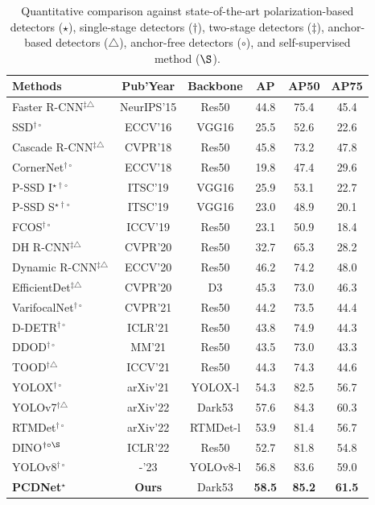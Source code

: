 \begin{table}[ht]
\caption{Quantitative comparison against state-of-the-art polarization-based detectors ($\star$), single-stage detectors ($\dag$), two-stage detectors ($\ddag$), anchor-based detectors ($\triangle$), anchor-free detectors ($\circ$), and self-supervised method ($\S$).}
\small
\centering
\renewcommand\arraystretch{0.9}
\setlength{\tabcolsep}{2.6pt}
\begin{tabular}{lccccc}
\hline\hline
Methods	&	Pub'Year	&	Backbone	&	AP	&	AP50	&	AP75	\\
\hline
Faster R-CNN$^{\ddag\triangle}$ 	&	NeurIPS'15	&	Res50	&	44.8	&	75.4	&	45.4	\\
SSD$^{\dag\circ}$ 	&	ECCV'16	&	VGG16	&	25.5	&	52.6	&	22.6	\\
Cascade R-CNN$^{\ddag\triangle}$ 	&	CVPR'18	&	Res50	&	45.8	&	73.2	&	47.8	\\
CornerNet$^{\dag\circ}$ 	&	ECCV'18	&	Res50	&	19.8	&	47.4	&	29.6	\\
P-SSD I$^{\star\dag\circ}$ 	&	ITSC'19	&	VGG16	&	25.9 	&	53.1	&	22.7	\\
P-SSD S$^{\star\dag\circ}$ 	&	ITSC'19	&	VGG16	&	23.0 	&	48.9	&	20.1	\\
FCOS$^{\dag\circ}$ 	&	ICCV'19	&	Res50	&	23.1	&	50.9	&	18.4	\\
DH R-CNN$^{\ddag\triangle}$ 	&	CVPR'20	&	Res50	&	32.7	&	65.3	&	28.2	\\
Dynamic R-CNN$^{\ddag\triangle}$ 	&	ECCV'20	&	Res50	&	46.2	&	74.2	&	48.0	\\
EfficientDet$^{\ddag\triangle}$ 	&	CVPR'20	&	D3	&	45.3	&	73.0	&	46.3	\\
VarifocalNet$^{\dag\circ}$  & CVPR'21 & Res50 & 44.2 &	73.5 &	44.4	\\
D-DETR$^{\dag\circ}$ 	&	ICLR'21	&	Res50	&	43.8	&	74.9	&	44.3	\\
DDOD$^{\dag\circ}$ 	&	MM'21	&	Res50	&	43.5	&	73.0	&	43.3	\\
TOOD$^{\dag\triangle}$ 	&	ICCV'21	&	Res50	&	44.3	&	74.3	&	44.6	\\
YOLOX$^{\dag\circ}$ 	&	arXiv'21	&	YOLOX-l	&	54.3	&	82.5	&	56.7	\\
YOLOv7$^{\dag\triangle}$	&	arXiv'22	&	Dark53	&	57.6	&	84.3	&	60.3	\\
RTMDet$^{\dag\circ}$ 	&	arXiv'22	&	RTMDet-l	&	53.9	&	81.4	&	56.7	\\
DINO$^{\dag\circ\S}$ 	&	ICLR'22	&	Res50	&	52.7	&	81.8	&	54.8	\\
YOLOv8$^{\dag\circ}$ 	&	-'23	&	YOLOv8-l	&	56.8	&	83.6	&	59.0	\\
\hline
\textbf{PCDNet$^\star$}	&	\textbf{Ours}	&	Dark53	&	\textbf{58.5}	&	\textbf{85.2}	&	\textbf{61.5}	\\
\hline\hline
\end{tabular}
\label{tab:comparison}
\end{table}

